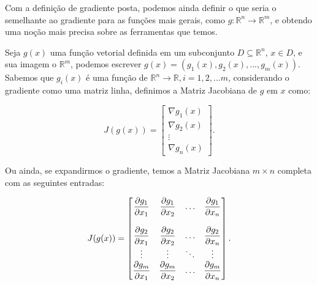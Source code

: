 Com a definição de gradiente posta, podemos ainda definir o que seria o
semelhante ao gradiente para as funções mais gerais, como
\( g: \mathbb{R}^n \rightarrow \mathbb{R}^m \),
e obtendo uma noção mais precisa sobre as ferramentas que temos.


\begin{definition}
    Seja \( g(x) \) uma função vetorial definida em um subconjunto
    \( D \subseteq \mathbb{R}^n \), \( x \in D \),
    e sua imagem o \( \mathbb{R}^m \), podemos escrever
    \( g(x) = (g_1(x), g_2(x), ..., g_m(x)) \). Sabemos que \( g_i(x) \) é
    uma função de \( \mathbb{R}^n \rightarrow \mathbb{R}, i = 1, 2, ... m \),
    considerando o gradiente como uma matriz linha, definimos a Matriz
    Jacobiana de \(g\) em \(x\) como:

    \begin{equation}
        J(g(x)) = \begin{bmatrix}
                    \nabla g_1(x) \\
                    \nabla g_2(x) \\
                    \vdots \\
                    \nabla g_n(x)
                  \end{bmatrix}.
    \end{equation}

    Ou ainda, se expandirmos o gradiente, temos a Matriz Jacobiana \( m \times n \)
    completa com as seguintes entradas:

    \begin{equation}
        J(g(x)) = \begin{bmatrix}
                    \displaystyle{\frac{\partial g_1}{\partial x_1}} & \displaystyle{\frac{\partial g_1}{\partial x_2}} & \hdots & \displaystyle{\frac{\partial g_1}{\partial x_n}}\\
                    \\
                    \displaystyle{\frac{\partial g_2}{\partial x_1}} & \displaystyle{\frac{\partial g_2}{\partial x_2}} & \hdots & \displaystyle{\frac{\partial g_2}{\partial x_n}}\\
                    \vdots & \vdots & \ddots & \vdots \\
                    \displaystyle{\frac{\partial g_m}{\partial x_1}} & \displaystyle{\frac{\partial g_m}{\partial x_2}} & \hdots & \displaystyle{\frac{\partial g_m}{\partial x_n}}\\
                  \end{bmatrix}.
    \end{equation}


\end{definition}



%
